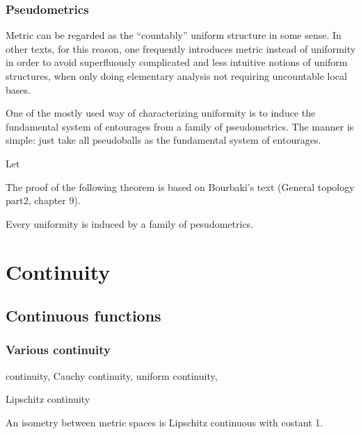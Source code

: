 \documentclass{../crs}
\begin{document}
\subsection{Pseudometrics}

Metric can be regarded as the ``countably'' uniform structure in some sense. 
In other texts, for this reason, one frequently introduces metric instead of uniformity in order to avoid superfluously complicated and less intuitive notions of uniform structures, when only doing elementary analysis not requiring uncountable local bases.



One of the mostly used way of characterizing uniformity is to induce the fundamental system of entourages from a family of pseudometrics.
The manner is simple: just take all pseudoballs as the fundamental system of entourages.
\begin{defn}
Let 
\end{defn}
The proof of the following theorem is based on Bourbaki's text (General topology part2, chapter 9).

\begin{thm}
Every uniformity is induced by a family of pesudometrics.
\end{thm}
\begin{pf}

\end{pf}


















\chapter{Continuity}


\section{Continuous functions}

\subsection{Various continuity}
continuity, Cauchy continuity, uniform continuity, 

Lipschitz continuity
\begin{ex}
An isometry between metric spaces is Lipschitz continuous with costant 1.
\end{ex}
\end{document}
